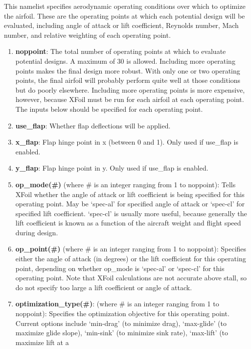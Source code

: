 \documentclass[11pt]{article}
\begin{document}
This namelist specifies aerodynamic operating conditions over which to optimize the
airfoil.  These are the operating points at which each potential design will be evaluated,
including angle of attack or lift coefficient, Reynolds number, Mach number, and
relative weighting of each operating point.

\begin{enumerate}
\item{\textbf{noppoint}: The total number of operating points at which to evaluate
potential designs.  A maximum of 30 is allowed.  Including more operating points makes the
final design more robust.  With only one or two operating points, the final airfoil will
probably perform quite well at those conditions but do poorly elsewhere.  Including more
operating points is more expensive, however, because XFoil must be run for each airfoil at
each operating point.  The inputs below should be specified for each operating point.}
\item{\textbf{use\_flap}: Whether flap deflections will be applied.}
\item{\textbf{x\_flap}: Flap hinge point in x (between 0 and 1). Only used if use\_flap is
enabled.}
\item{\textbf{y\_flap}: Flap hinge point in y. Only used if use\_flap is enabled.}
\item{\textbf{op\_mode(\#)} (where \# is an integer ranging from 1 to noppoint): Tells
XFoil whether the angle of attack or lift coefficient is being specified for this
operating point.  May be `spec-al' for specified angle of attack or `spec-cl' for
specified lift coefficient. `spec-cl' is usually more useful, because generally the lift
coefficient is known as a function of the aircraft weight and flight speed during design.}
\item{\textbf{op\_point(\#)} (where \# is an integer ranging from 1 to noppoint):
Specifies either the angle of attack (in degrees) or the lift coefficient for this
operating point, depending on whether op\_mode is `spec-al' or `spec-cl' for this
operating point.  Note that XFoil calculations are not accurate above stall, so do not
specify too large a lift coefficient or angle of attack.}
\item{\textbf{optimization\_type(\#)}: (where \# is an integer ranging from 1 to
noppoint): Specifies the optimization objective for this operating point. Current options 
include `min-drag' (to minimize drag), `max-glide' (to maximize 
glide slope), `min-sink' (to minimize sink rate), `max-lift' (to maximize lift at a
}
\end{enumerate}
\end{document}
